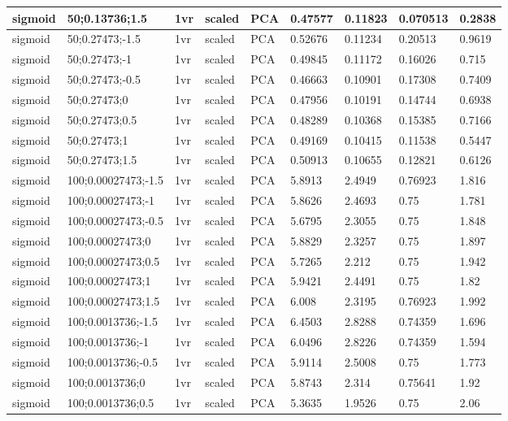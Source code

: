 \begin{longtable}{lllllllll}
sigmoid & 50;0.13736;1.5 & 1vr & scaled & PCA & 0.47577 & 0.11823 & 0.070513 & 0.2838\\ \hline
sigmoid & 50;0.27473;-1.5 & 1vr & scaled & PCA & 0.52676 & 0.11234 & 0.20513 & 0.9619\\ \hline
sigmoid & 50;0.27473;-1 & 1vr & scaled & PCA & 0.49845 & 0.11172 & 0.16026 & 0.715\\ \hline
sigmoid & 50;0.27473;-0.5 & 1vr & scaled & PCA & 0.46663 & 0.10901 & 0.17308 & 0.7409\\ \hline
sigmoid & 50;0.27473;0 & 1vr & scaled & PCA & 0.47956 & 0.10191 & 0.14744 & 0.6938\\ \hline
sigmoid & 50;0.27473;0.5 & 1vr & scaled & PCA & 0.48289 & 0.10368 & 0.15385 & 0.7166\\ \hline
sigmoid & 50;0.27473;1 & 1vr & scaled & PCA & 0.49169 & 0.10415 & 0.11538 & 0.5447\\ \hline
sigmoid & 50;0.27473;1.5 & 1vr & scaled & PCA & 0.50913 & 0.10655 & 0.12821 & 0.6126\\ \hline
sigmoid & 100;0.00027473;-1.5 & 1vr & scaled & PCA & 5.8913 & 2.4949 & 0.76923 & 1.816\\ \hline
sigmoid & 100;0.00027473;-1 & 1vr & scaled & PCA & 5.8626 & 2.4693 & 0.75 & 1.781\\ \hline
sigmoid & 100;0.00027473;-0.5 & 1vr & scaled & PCA & 5.6795 & 2.3055 & 0.75 & 1.848\\ \hline
sigmoid & 100;0.00027473;0 & 1vr & scaled & PCA & 5.8829 & 2.3257 & 0.75 & 1.897\\ \hline
sigmoid & 100;0.00027473;0.5 & 1vr & scaled & PCA & 5.7265 & 2.212 & 0.75 & 1.942\\ \hline
sigmoid & 100;0.00027473;1 & 1vr & scaled & PCA & 5.9421 & 2.4491 & 0.75 & 1.82\\ \hline
sigmoid & 100;0.00027473;1.5 & 1vr & scaled & PCA & 6.008 & 2.3195 & 0.76923 & 1.992\\ \hline
sigmoid & 100;0.0013736;-1.5 & 1vr & scaled & PCA & 6.4503 & 2.8288 & 0.74359 & 1.696\\ \hline
sigmoid & 100;0.0013736;-1 & 1vr & scaled & PCA & 6.0496 & 2.8226 & 0.74359 & 1.594\\ \hline
sigmoid & 100;0.0013736;-0.5 & 1vr & scaled & PCA & 5.9114 & 2.5008 & 0.75 & 1.773\\ \hline
sigmoid & 100;0.0013736;0 & 1vr & scaled & PCA & 5.8743 & 2.314 & 0.75641 & 1.92\\ \hline
sigmoid & 100;0.0013736;0.5 & 1vr & scaled & PCA & 5.3635 & 1.9526 & 0.75 & 2.06\\ \hline

\end{longtable}
